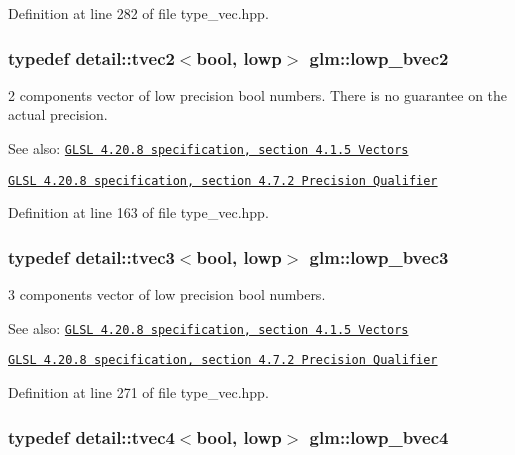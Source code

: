 Definition at line 282 of file type\_\-vec.hpp.\hypertarget{group__core__precision_g8ff6222d4bb4245106dab0727c8e8a45}{
\subsubsection[lowp\_\-bvec2]{\setlength{\rightskip}{0pt plus 5cm}typedef detail::tvec2$<$bool, lowp$>$ {\bf glm::lowp\_\-bvec2}}}
\label{group__core__precision_g8ff6222d4bb4245106dab0727c8e8a45}


2 components vector of low precision bool numbers. There is no guarantee on the actual precision.

\begin{Desc}
\item[See also:]\href{http://www.opengl.org/registry/doc/GLSLangSpec.4.20.8.pdf}{\tt GLSL 4.20.8 specification, section 4.1.5 Vectors} 

\href{http://www.opengl.org/registry/doc/GLSLangSpec.4.20.8.pdf}{\tt GLSL 4.20.8 specification, section 4.7.2 Precision Qualifier} \end{Desc}


Definition at line 163 of file type\_\-vec.hpp.\hypertarget{group__core__precision_g17ac2986f7b315a2ac4ee2662b5be9cb}{
\subsubsection[lowp\_\-bvec3]{\setlength{\rightskip}{0pt plus 5cm}typedef detail::tvec3$<$bool, lowp$>$ {\bf glm::lowp\_\-bvec3}}}
\label{group__core__precision_g17ac2986f7b315a2ac4ee2662b5be9cb}


3 components vector of low precision bool numbers.

\begin{Desc}
\item[See also:]\href{http://www.opengl.org/registry/doc/GLSLangSpec.4.20.8.pdf}{\tt GLSL 4.20.8 specification, section 4.1.5 Vectors} 

\href{http://www.opengl.org/registry/doc/GLSLangSpec.4.20.8.pdf}{\tt GLSL 4.20.8 specification, section 4.7.2 Precision Qualifier} \end{Desc}


Definition at line 271 of file type\_\-vec.hpp.\hypertarget{group__core__precision_g24c651dc8cb20779b3773428aef4f7f4}{
\subsubsection[lowp\_\-bvec4]{\setlength{\rightskip}{0pt plus 5cm}typedef detail::tvec4$<$bool, lowp$>$ {\bf glm::lowp\_\-bvec4}}}
\label{group__core__precision_g24c651dc8cb20779b3773428aef4f7f4}


